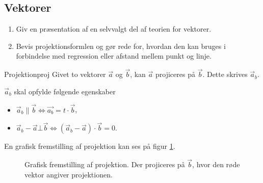 \documentclass{article}
\begin{document}
\begin{tcolorbox}
	\section{Vektorer}
	\tcblower
	\begin{enumerate}
		\item Giv en præsentation af en selvvalgt del af teorien for vektorer.
		\item Bevis projektionsformlen og gør rede for, hvordan den kan bruges
			i forbindelse med regression eller afstand mellem punkt og linje.
	\end{enumerate}
\end{tcolorbox}

\begin{definition}{Projektion}{proj}
	Givet to vektorer $\vec{a}$ og $\vec{b}$, kan $\vec{a}$ projiceres på
	$\vec{b}$. Dette skrives $\vec{a}_b$.

	$\vec{a}_b$ skal opfylde følgende egenskaber
	\begin{itemize}
		\item $\vec{a}_b \parallel \vec{b} \iff \vec{a_b} = t \cdot \vec{b}$,
		\item $\vec{a}_b - \vec{a} \bot \vec{b} \iff (\vec{a}_b - \vec{a}) \cdot \vec{b} = 0$.
	\end{itemize}
\end{definition}
En grafisk fremstilling af projektion kan ses på figur \ref{projektion}.
\begin{figure}[hbt]
	\centering
	\caption{Grafisk fremstilling af projektion. Der projiceres på $\vec{b}$,
	hvor den røde vektor angiver projektionen.}
	\label{projektion}
\end{figure}
\end{document}
